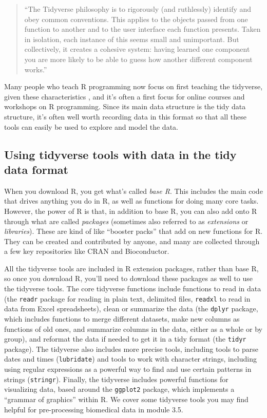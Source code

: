 \documentclass[]{tufte-book}
\begin{document}
\begin{quote}
``The Tidyverse
philosophy is to rigorously (and ruthlessly) identify and obey common
conventions. This applies to the objects passed from one function to another
and to the user interface each function presents. Taken in isolation, each
instance of this seems small and unimportant. But collectively, it creates
a cohesive system: having learned one component you are more likely to be
able to guess how another different component works.''
\citep{bryan2017data}
\end{quote}

Many people who teach
R programming now focus on first teaching the tidyverse, given these
characteristics \citep{robinson2017teach, peng2018teaching}, and it's often a
first focus for online courses and workshops on R programming. Since its main
data structure is the tidy data structure, it's often well worth recording
data in this format so that all these tools can easily be used to explore and
model the data.

\subsection{Using tidyverse tools with data in the tidy data format}\label{using-tidyverse-tools-with-data-in-the-tidy-data-format}

When you download R, you get what's called \emph{base R}. This includes the main code
that drives anything you do in R, as well as functions for doing many core
tasks. However, the power of R is that, in addition to base R, you can also add
onto R through what are called \emph{packages} (sometimes also referred to as
\emph{extensions} or \emph{libraries}). These are kind of like ``booster packs'' that add on
new functions for R. They can be created and contributed by anyone, and many are
collected through a few key repositories like CRAN and Bioconductor.

All the tidyverse tools are included in R extension packages, rather than base
R, so once you download R, you'll need to download these packages as well to use
the tidyverse tools. The core tidyverse functions include functions to read in
data (the \texttt{readr} package for reading in plain text, delimited files, \texttt{readxl}
to read in data from Excel spreadsheets), clean or summarize the data (the
\texttt{dplyr} package, which includes functions to merge different datasets, make
new columns as functions of old ones, and summarize columns in the data, either
as a whole or by group), and reformat the data if needed to get it in a tidy
format (the \texttt{tidyr} package). The tidyverse also includes more precise tools,
including tools to parse dates and times (\texttt{lubridate}) and tools to work with
character strings, including using regular expressions as a powerful way to find
and use certain patterns in strings (\texttt{stringr}). Finally, the tidyverse
includes powerful functions for visualizing data, based around the \texttt{ggplot2}
package, which implements a ``grammar of graphics'' within R. We cover some
tidyverse tools you may find helpful for pre-processing biomedical data in
module 3.5.
\end{document}
